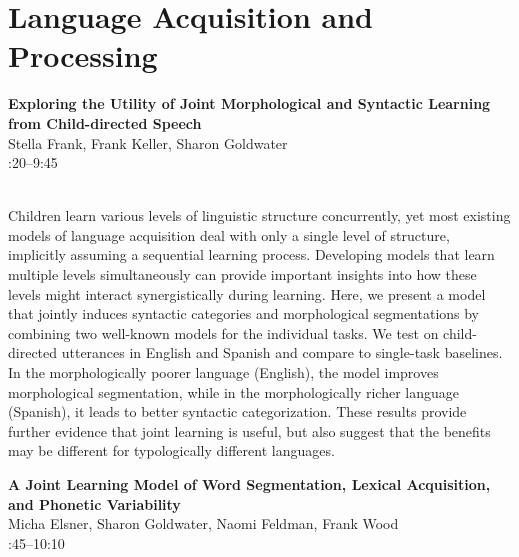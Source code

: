 \documentclass[twoside,makeidx]{book}
\renewcommand{\normalsize}{\fontsize{8}{9}\selectfont}
\renewcommand{\small}{\fontsize{7}{8}\selectfont}
\begin{document}
\section{Language Acquisition and Processing}
\vspace{-1em}
\par\vspace{2em}\noindent%
\begin{minipage}{\linewidth}%
\begin{center}
\textbf{\normalsize Exploring the Utility of Joint Morphological and Syntactic Learning from Child-directed Speech}\\
\normalsize  Stella Frank,  Frank Keller,  Sharon Goldwater\\
{\small 9:20--9:45}\\
\end{center}
\end{minipage}\\[0.5em]
\nopagebreak%
\noindent%
{\small Children learn various levels of linguistic structure concurrently, yet most existing models of language acquisition deal with only a single level of structure, implicitly assuming a sequential learning process.  Developing models that learn multiple levels simultaneously can provide important insights into how these levels might interact synergistically during learning. Here, we present a model that jointly induces syntactic categories and morphological segmentations by combining two well-known models for the individual tasks.  We test on child-directed utterances in English and Spanish and compare to single-task baselines. In the morphologically poorer language (English), the model improves morphological segmentation, while in the morphologically richer language (Spanish), it leads to better  syntactic categorization. These results provide further evidence that joint learning is useful, but also suggest that the benefits may be different for typologically different languages.}
\par\vspace{2em}\noindent%
\begin{minipage}{\linewidth}%
\begin{center}
\textbf{\normalsize A Joint Learning Model of Word Segmentation, Lexical Acquisition, and Phonetic Variability}\\
\normalsize  Micha Elsner,  Sharon Goldwater,  Naomi Feldman,  Frank Wood\\
{\small 9:45--10:10}\\
\end{center}
\end{minipage}\\[0.5em]
\end{document}
